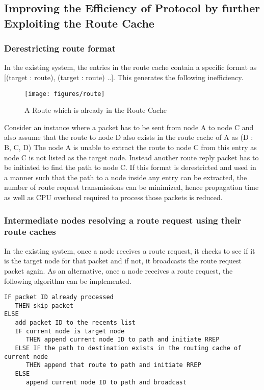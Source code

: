 \documentclass[a4paper,11pt]{article}%
\begin{document}


\subsection{Improving the Efficiency of Protocol by further Exploiting the Route Cache}

\subsubsection{Derestricting route format}
In the existing system, the entries in the route cache contain a specific format as [(target : route), (target : route) ..].
This generates the following inefficiency.
\begin{figure}[!h]
	\centering
	\texttt{[image: figures/route]}
	\caption{A Route which is already in the Route Cache}
\end{figure}

Consider an instance where a packet has to be sent from node A to node C and also assume that the route to node D also exists in the route cache of A as (D : B, C, D)
The node A is unable to extract the route to node C from this entry as node C is not listed as the target node. Instead another route reply packet has to be initiated to find the path to node C.
If this format is derestricted and used in a manner such that the path to a node inside any entry can be extracted, the number of route request transmissions can be minimized, hence propagation time as well as CPU overhead required to process those packets is reduced.

\subsubsection{Intermediate nodes resolving a route request using their route caches}
In the existing system, once a node receives a route request, it checks to see if it is the target node for that packet and if not, it broadcasts the route request packet again.
As an alternative, once a node receives a route request, the following algorithm can be implemented.

\begin{verbatim}
IF packet ID already processed
   THEN skip packet
ELSE
   add packet ID to the recents list
   IF current node is target node
      THEN append current node ID to path and initiate RREP
   ELSE IF the path to destination exists in the routing cache of current node
      THEN append that route to path and initiate RREP
   ELSE
      append current node ID to path and broadcast
\end{verbatim}
\end{document}
